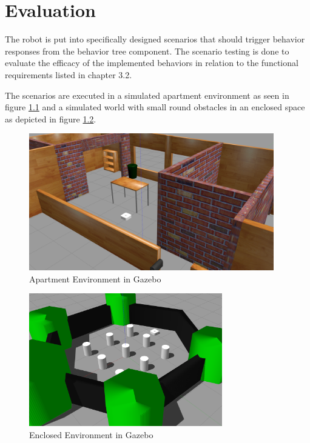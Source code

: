 \chapter{Evaluation}
\label{cha:ergebnisse}

The robot is put into specifically designed scenarios that should trigger behavior responses from the behavior tree component. The scenario testing is done to evaluate the efficacy of the implemented behaviors in relation to the functional requirements listed in chapter 3.2.

The scenarios are executed in a simulated apartment environment as seen in figure \ref{fig:house_gazebo} and a simulated world with small round obstacles in an enclosed space as depicted in figure \ref{fig:world_gazebo}. 
\begin{center}
\begin{figure}[ht]
	\includegraphics[width=0.95\textwidth]{images/house_env.png}
	\caption{Apartment Environment in Gazebo}
	\label{fig:house_gazebo}
\end{figure}
\end{center}

\begin{center}
\begin{figure}
	\includegraphics[width=0.75\textwidth]{images/world_env.png}
	\caption{Enclosed Environment in Gazebo}
	\label{fig:world_gazebo}
\end{figure}
\end{center}

